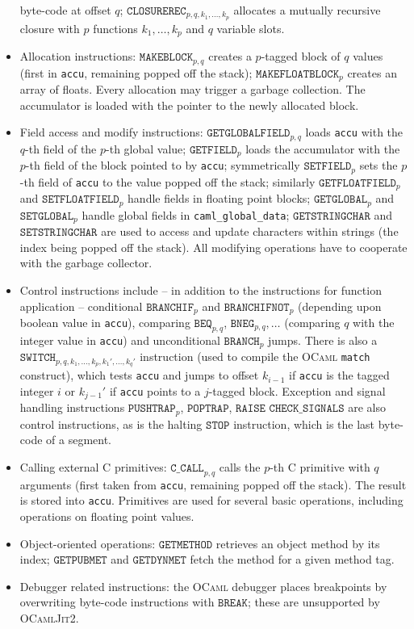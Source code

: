 \documentclass[10pt,a4paper,twocolumn]{article}
\begin{document}
\begin{itemize}
  byte-code at offset $q$; $\mathtt{CLOSUREREC}_{p,q,k_1,\ldots,k_p}$ allocates a mutually recursive 
  closure with $p$ functions $k_1,\ldots,k_p$ and $q$ variable slots.
\item Allocation instructions: $\mathtt{MAKEBLOCK}_{p,q}$ creates a $p$-tagged block of $q$ values (first
  in \texttt{accu}, remaining popped off the stack); $\mathtt{MAKEFLOATBLOCK}_p$ creates an array of floats.
  Every allocation may trigger a garbage collection. The accumulator is loaded with the pointer to the
  newly allocated block.
\item Field access and modify instructions: $\mathtt{GETGLOBALFIELD}_{p,q}$ loads \texttt{accu} with the
  $q$-th field of the $p$-th global value; $\mathtt{GETFIELD}_p$ loads the accumulator with the $p$-th
  field of the block pointed to by \texttt{accu}; symmetrically $\mathtt{SETFIELD}_p$ sets the $p$-th
  field of \texttt{accu} to the value popped off the stack; similarly $\mathtt{GETFLOATFIELD}_p$ and
  $\mathtt{SETFLOATFIELD}_p$ handle fields in floating point blocks; $\mathtt{GETGLOBAL}_p$ and
  $\mathtt{SETGLOBAL}_p$ handle global fields in \texttt{caml\_global\_data}; $\mathtt{GETSTRINGCHAR}$
  and $\mathtt{SETSTRINGCHAR}$ are used to access and update characters within strings (the index
  being popped off the stack). All modifying operations have to cooperate with the garbage collector.
\item Control instructions include -- in addition to the instructions for function application --
  conditional $\mathtt{BRANCHIF}_p$ and $\mathtt{BRANCHIFNOT}_p$ (depending upon boolean value in
  \texttt{accu}), comparing $\mathtt{BEQ}_{p,q}$, $\mathtt{BNEG}_{p,q}, \ldots$ (comparing $q$ with
  the integer value in \texttt{accu}) and unconditional $\mathtt{BRANCH}_p$ jumps. There is also
  a $\mathtt{SWITCH}_{p,q,k_1,\ldots,k_p,k_1',\ldots,k_q'}$ instruction (used to compile the \textsc{OCaml}
  \texttt{match} construct), which tests \texttt{accu} and jumps to offset $k_{i-1}$ if \texttt{accu}
  is the tagged integer $i$ or $k_{j-1}'$ if \texttt{accu} points to a $j$-tagged block.
  Exception and signal handling instructions $\mathtt{PUSHTRAP}_p$, $\mathtt{POPTRAP}$, $\mathtt{RAISE}$
  $\mathtt{CHECK\_SIGNALS}$ are also control instructions, as is the halting $\mathtt{STOP}$ instruction,
  which is the last byte-code of a segment.
\item Calling external C primitives: $\mathtt{C\_CALL}_{p,q}$ calls the $p$-th C primitive with
  $q$ arguments (first taken from \texttt{accu}, remaining popped off the stack). The result
  is stored into \texttt{accu}. Primitives are used for several basic operations, including
  operations on floating point values.
\item Object-oriented operations: $\mathtt{GETMETHOD}$ retrieves an object method by its index;
  $\mathtt{GETPUBMET}$ and $\mathtt{GETDYNMET}$ fetch the method for a given method tag.
\item Debugger related instructions: the \textsc{OCaml} debugger places breakpoints by
  overwriting byte-code instructions with $\mathtt{BREAK}$; these are unsupported by
  \textsc{OCamlJit2}.
\end{itemize}
\end{document}
